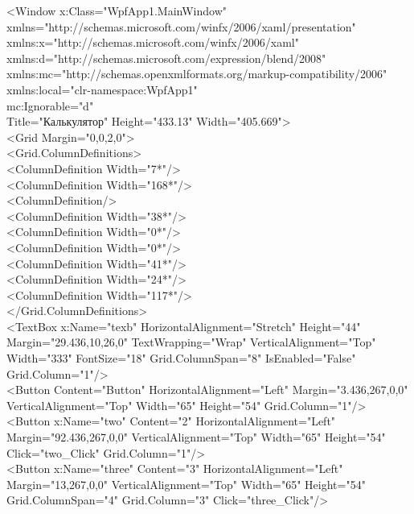 <Window x:Class="WpfApp1.MainWindow"\\
        xmlns="http://schemas.microsoft.com/winfx/2006/xaml/presentation"\\
        xmlns:x="http://schemas.microsoft.com/winfx/2006/xaml"\\
        xmlns:d="http://schemas.microsoft.com/expression/blend/2008"\\
        xmlns:mc="http://schemas.openxmlformats.org/markup-compatibility/2006"\\
        xmlns:local="clr-namespace:WpfApp1"\\
        mc:Ignorable="d"\\
        Title="Калькулятор" Height="433.13" Width="405.669">\\
    <Grid Margin="0,0,2,0">\\
        <Grid.ColumnDefinitions>\\
            <ColumnDefinition Width="7*"/>\\
            <ColumnDefinition Width="168*"/>\\
            <ColumnDefinition/>\\
            <ColumnDefinition Width="38*"/>\\
            <ColumnDefinition Width="0*"/>\\
            <ColumnDefinition Width="0*"/>\\
            <ColumnDefinition Width="41*"/>\\
            <ColumnDefinition Width="24*"/>\\
            <ColumnDefinition Width="117*"/>\\
        </Grid.ColumnDefinitions>\\
        <TextBox x:Name="texb" HorizontalAlignment="Stretch" Height="44" Margin="29.436,10,26,0" TextWrapping="Wrap" VerticalAlignment="Top" Width="333" FontSize="18" Grid.ColumnSpan="8" IsEnabled="False" Grid.Column="1"/>\\
        <Button Content="Button" HorizontalAlignment="Left" Margin="3.436,267,0,0" VerticalAlignment="Top" Width="65" Height="54" Grid.Column="1"/>\\
        <Button x:Name="two" Content="2" HorizontalAlignment="Left" Margin="92.436,267,0,0" VerticalAlignment="Top" Width="65" Height="54" Click="two\_Click" Grid.Column="1"/>\\
        <Button x:Name="three" Content="3" HorizontalAlignment="Left" Margin="13,267,0,0" VerticalAlignment="Top" Width="65" Height="54" Grid.ColumnSpan="4" Grid.Column="3" Click="three\_Click"/>\\
